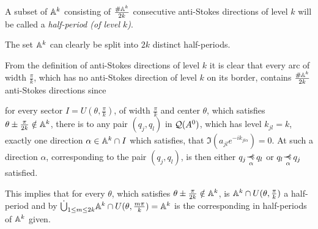 \begin{defn}
  A subset of $\mathbb{A}^k$ consisting of $\frac{\#\mathbb{A}^k}{2k}$ consecutive anti-Stokes
  directions of level $k$ will be called a \emph{half-period (of level $k$)}.
  \begin{s-rem}
    The set $\mathbb{A}^k$ can clearly be split into $2k$ distinct half-periods.
  \end{s-rem}
\end{defn}
From the definition of anti-Stokes directions of level $k$ it is clear that
every arc of width $\frac{\pi}{k}$, which has no anti-Stokes direction of level
$k$ on its border, contains $\frac{\#\mathbb{A}^k}{2k}$ anti-Stokes directions
since
\begin{einr}
  for every sector $I=U(\theta,\frac{\pi}{k})$, of width $\frac{\pi}{k}$ and
  center $\theta$, which satisfies $\theta\pm\frac{\pi}{2k}\notin\mathbb{A}^k$,
  there is to any pair $(q_j,q_l)$ in $\mathcal{Q}(A^0)$, which has level $k_{jl}=k$,
  exactly one direction $\alpha\in \mathbb{A}^k\cap I$ which satisfies, that
  $\Im(a_{jl}e^{-ik_{jl\alpha}})=0$.
  At such a direction $\alpha$, corresponding to the pair $(q_j,q_l)$, is then
  either $q_j\myrel{\alpha}q_l$ or $q_l\myrel{\alpha}q_j$ satisfied.
\end{einr}
This implies that for every $\theta$, which satisfies
$\theta\pm\frac{\pi}{2k}\notin\mathbb{A}^k$, is $\mathbb{A}^k\cap U(\theta,\frac{\pi}{k})$
a half-period and by
$\dot\bigcup_{1\leq m\leq 2k}\mathbb{A}^k\cap U(\theta,\frac{m\pi}{k})=\mathbb{A}^k$ is the
corresponding  in half-periods of $\mathbb{A}^k$ given.

